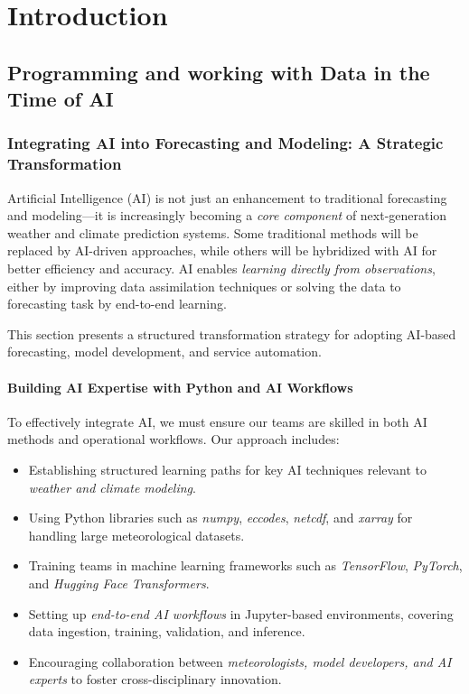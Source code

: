 \chapter{Introduction}

\section{Programming and working with Data in the Time of AI}

\subsection{Integrating AI into Forecasting and Modeling: A Strategic Transformation}

Artificial Intelligence (AI) is not just an enhancement to traditional forecasting and modeling—it is increasingly becoming a \emph{core component} of next-generation weather and climate prediction systems. Some traditional methods will be replaced by AI-driven approaches, while others will be hybridized with AI for better efficiency and accuracy. AI enables \emph{learning directly from observations}, either by improving data assimilation techniques or solving the data to forecasting task by end-to-end learning.

This section presents a structured transformation strategy for adopting AI-based forecasting, model development, and service automation.

\subsubsection{Building AI Expertise with Python and AI Workflows}
To effectively integrate AI, we must ensure our teams are skilled in both AI methods and operational workflows. Our approach includes:
\begin{itemize}[itemsep=1pt,topsep=3pt]

    \item Establishing structured learning paths for key AI techniques relevant to \emph{weather and climate modeling}.
    \item Using Python libraries such as \emph{numpy}, \emph{eccodes}, \emph{netcdf}, and \emph{xarray} for handling large meteorological datasets.
    \item Training teams in machine learning frameworks such as \emph{TensorFlow}, \emph{PyTorch}, and \emph{Hugging Face Transformers}.
    \item Setting up \emph{end-to-end AI workflows} in Jupyter-based environments, covering data ingestion, training, validation, and inference.
    \item Encouraging collaboration between \emph{meteorologists, model developers, and AI experts} to foster cross-disciplinary innovation.
\end{itemize}

